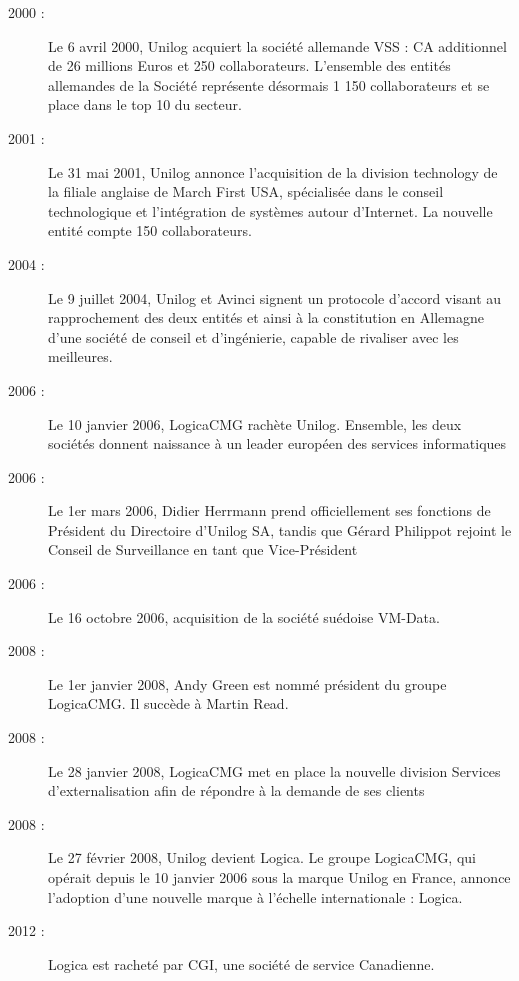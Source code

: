 \begin{description}
\item[2000 :]     Le 6 avril 2000, Unilog acquiert la société allemande VSS : CA additionnel de 26 millions Euros et 250 collaborateurs. L'ensemble des entités allemandes de la Société représente désormais 1 150 collaborateurs et se place dans le top 10 du secteur. 

\item[2001 :]     Le 31 mai 2001, Unilog annonce l'acquisition de la division technology de la filiale anglaise de March First USA, spécialisée dans le conseil technologique et l'intégration de systèmes autour d'Internet. La nouvelle entité compte 150 collaborateurs. 

\item[2004 :]     Le 9 juillet 2004, Unilog et Avinci signent un protocole d'accord visant au rapprochement des deux entités et ainsi à la constitution en Allemagne d'une société de conseil et d'ingénierie, capable de rivaliser avec les meilleures. 

\item[2006 :]     Le 10 janvier 2006, LogicaCMG rachète Unilog. Ensemble, les deux sociétés donnent naissance à un leader européen des services informatiques 

\item[2006 :]     Le 1er mars 2006, Didier Herrmann prend officiellement ses fonctions de Président du Directoire d'Unilog SA, tandis que Gérard Philippot rejoint le Conseil de Surveillance en tant que Vice-Président

\item[2006 :]	  Le 16 octobre 2006, acquisition de la société suédoise VM-Data.

\item[2008 :]     Le 1er janvier 2008, Andy Green est nommé président du groupe LogicaCMG. Il succède à Martin Read. 

\item[2008 :]     Le 28 janvier 2008, LogicaCMG met en place la nouvelle division Services  d'externalisation afin de répondre à la demande de ses clients 

\item[2008 :] 	  Le 27 février 2008, Unilog devient Logica.  Le groupe LogicaCMG, qui opérait depuis le 10 janvier 2006 sous la marque Unilog en France, annonce l’adoption d’une nouvelle marque à l’échelle internationale : Logica. 

\item[2012 :]	  Logica est racheté par CGI, une société de service Canadienne.
 
\end{description}

